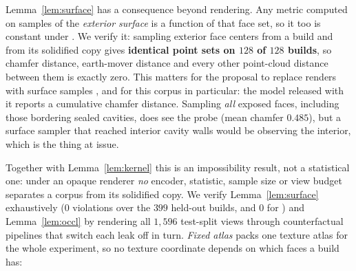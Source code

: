 Lemma~\ref{lem:surface} has a consequence beyond rendering. Any metric computed
on samples of the \emph{exterior surface} is a function of that face set, so it
too is constant under \solidify{}. We verify it: sampling exterior face centers
from a build and from its solidified copy gives \textbf{identical point sets on
$128$ of $128$ builds}, so chamfer distance, earth-mover distance and every
other point-cloud distance between them is exactly zero. This matters for the
proposal to replace renders with surface samples
\citep{luan2026rendermetric}, and for this corpus in particular: the model
released with it \citep{chen2019voxelcnn} reports a cumulative chamfer distance.
Sampling \emph{all} exposed faces, including those bordering sealed cavities,
does see the probe (mean chamfer $0.485$), but a surface sampler that reached
interior cavity walls would be observing the interior, which is the thing at
issue.

Together with Lemma~\ref{lem:kernel} this is an impossibility result, not a
statistical one: under an opaque renderer \emph{no} encoder, statistic, sample
size or view budget separates a corpus from its solidified copy. We verify
Lemma~\ref{lem:surface} exhaustively ($0$ violations over the $399$ held-out
builds, and $0$ for \hollow{}) and Lemma~\ref{lem:occl} by rendering all $1{,}596$
test-split views through counterfactual pipelines that switch each leak off in turn.
\emph{Fixed atlas} packs one texture atlas for the whole experiment, so no texture
coordinate depends on which faces a build has:

\begin{center}\small
{}
\end{center}

